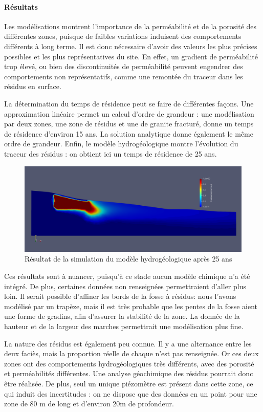 \documentclass{article}
\begin{document}
\paragraph{Résultats}

Les modélisations montrent l’importance de la perméabilité et de la porosité des différentes zones, puisque de faibles variations induisent des comportements différents à long terme. Il est donc nécessaire d’avoir des valeurs les plus précises possibles et les plus représentatives du site. En effet, un gradient de perméabilité trop élevé, ou bien des discontinuités de perméabilité peuvent engendrer des comportements non représentatifs, comme une remontée du traceur dans les résidus en surface.

La détermination du temps de résidence peut se faire de différentes façons. Une approximation linéaire permet un calcul d’ordre de grandeur : une modélisation par deux zones, une zone de résidus et une de granite fracturé, donne un temps de résidence d’environ 15 ans. La solution analytique donne également le même ordre de grandeur. Enfin, le modèle hydrogéologique montre l’évolution du traceur des résidus : on obtient ici un temps de résidence de 25 ans.

\begin{figure}[!h]
    \centering
    \includegraphics[width=0.8\linewidth]{III_B_3_5.png}
    \caption{Résultat de la simulation du modèle hydrogéologique après 25 ans}
    \label{hytec_hydro_25ans}
\end{figure}

Ces résultats sont à nuancer, puisqu’à ce stade aucun modèle chimique n’a été intégré. De plus, certaines données non renseignées permettraient d’aller plus loin. Il serait possible d’affiner les bords de la fosse à résidus: nous l’avons modélisé par un trapèze, mais il est très probable que les pentes de la fosse aient une forme de gradins, afin d’assurer la stabilité de la zone. La donnée de la hauteur et de la largeur des marches permettrait une modélisation plus fine.

La nature des résidus est également peu connue. Il y a une alternance entre les deux faciès, mais la proportion réelle de chaque n’est pas renseignée. Or ces deux zones ont des comportements hydrogéologiques très différents, avec des porosité et perméabilités différentes. Une analyse géochimique des résidus pourrait donc être réalisée. De plus, seul un unique piézomètre est présent dans cette zone, ce qui induit des incertitudes : on ne dispose que des données en un point pour une zone de 80 m de long et d’environ 20m de profondeur.
\end{document}
